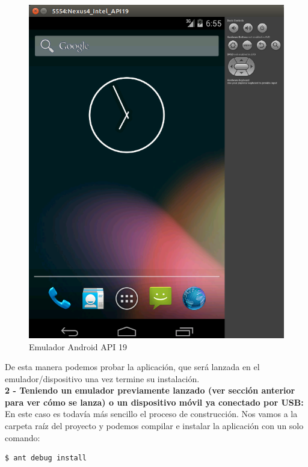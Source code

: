 	\begin{figure}[H]
      \centering
	\includegraphics[keepaspectratio, scale=0.3]{Media/Captures/emulator_api_19.png}
      \caption{Emulador Android API 19}
      \label{fig:android_emulator19}
    \end{figure} 
    
    De esta manera podemos probar la aplicación, que será lanzada en el emulador/dispositivo una vez termine su instalación. \\[.2cm]

	\textbf{2 - Teniendo un emulador previamente lanzado (ver sección anterior para ver cómo se lanza) o un dispositivo móvil ya conectado por USB:} \\[.2cm]
	
	En este caso es todavía más sencillo el proceso de construcción. Nos vamos a la carpeta raíz del proyecto  y podemos compilar e instalar la aplicación con un solo comando:

 	 \begin{lstlisting}[style=console, numbers=none]
		$ ant debug install
	\end{lstlisting}	
 	 
